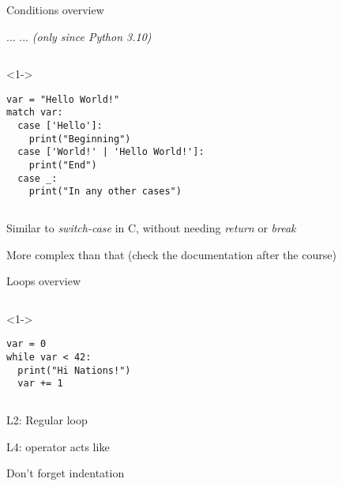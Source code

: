 
\begin{frame}[fragile]{Conditions overview}

   ...  ...  \hspace{3cm}  \textit{(only since Python 3.10)}

  \begin{columns}[onlytextwidth]
    \begin{column}{\textwidth}
      \begin{onlyenv}<1->
        \begin{lstlisting}[style=python]
var = "Hello World!"
match var:
  case ['Hello']:
    print("Beginning")
  case ['World!' | 'Hello World!']:
    print("End")
  case _:
    print("In any other cases") \end{lstlisting}
      \end{onlyenv}
    \end{column}
  \end{columns}

   Similar to \textit{switch-case} in C, without needing \textit{return} or \textit{break}

   More complex than that (check the documentation after the course)

\end{frame}




\begin{frame}[fragile]{Loops overview}


  \begin{columns}[onlytextwidth]
    \begin{column}{\textwidth}
      \begin{onlyenv}<1->
        \begin{lstlisting}[style=python]
var = 0
while var < 42:
  print("Hi Nations!")
  var += 1 \end{lstlisting}
      \end{onlyenv}
    \end{column}
  \end{columns}

   L2: Regular  loop

   L4: \TTBF{+=} operator acts like 

   Don't forget indentation

\end{frame}


